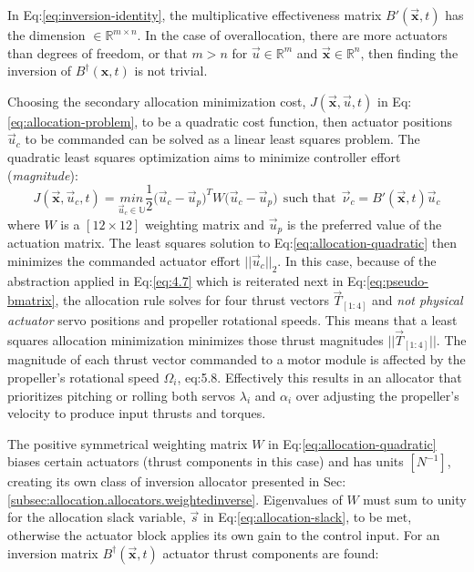 In Eq:\ref{eq:inversion-identity}, the multiplicative effectiveness matrix $B'(\vec{\mathbf{x}},t)$ has the dimension $\in\mathbb{R}^{m\times n}$. In the case of overallocation, there are more actuators than degrees of freedom, or that $m>n$ for $\vec{u}\in\mathbb{R}^{m}$ and $\vec{\mathbf{x}}\in\mathbb{R}^{n}$, then finding the inversion of $B^\dagger(\mathbf{x},t)$ is not trivial. 
\par
Choosing the secondary allocation minimization cost, $J(\vec{\mathbf{x}},\vec{u},t)$ in Eq:\ref{eq:allocation-problem}, to be a quadratic cost function, then actuator positions $\vec{u}_c$ to be commanded can be solved as a linear least squares problem. The quadratic least squares optimization aims to minimize controller effort (\emph{magnitude}):
\begin{equation}\label{eq:allocation-quadratic}
J(\vec{\mathbf{x}},\vec{u}_c,t)=\underset{\vec{u}_c\in\mathbb{U}}{min}\frac{1}{2}\big(\vec{u}_c-\vec{u}_p\big)^TW\big(\vec{u}_c-\vec{u}_p)~~\text{such that}~~\vec{\nu}_c=B'(\vec{\mathbf{x}},t)\vec{u}_c
\end{equation}
where $W$ is a $[12\times 12]$ weighting matrix and $\vec{u}_p$ is the preferred value of the actuation matrix. The least squares solution \cite{matrixcomputations} to Eq:\ref{eq:allocation-quadratic} then minimizes the commanded actuator effort $||\vec{u}_c||_2$. In this case, because of the abstraction applied in Eq:\ref{eq:4.7} which is reiterated next in Eq:\ref{eq:pseudo-bmatrix}, the allocation rule solves for four thrust vectors $\vec{T}_{[1:4]}$ and \emph{not physical actuator} servo positions and propeller rotational speeds. This means that a least squares allocation minimization minimizes those thrust magnitudes $||\vec{T}_{[1:4]}||$. The magnitude of each thrust vector commanded to a motor module is affected by the propeller's rotational speed $\Omega_i$, {eq:5.8}. Effectively this results in an allocator that prioritizes pitching or rolling both servos $\lambda_i$ and $\alpha_i$ over adjusting the propeller's velocity to produce input thrusts and torques. 
\par
The positive symmetrical weighting matrix $W$ in Eq:\ref{eq:allocation-quadratic} biases certain actuators (thrust components in this case) and has units $[N^{-1}]$, creating its own class of inversion allocator presented in Sec:\ref{subsec:allocation.allocators.weightedinverse}. Eigenvalues of $W$ must sum to unity for the allocation slack variable, $\vec{s}$ in Eq:\ref{eq:allocation-slack}, to be met, otherwise the actuator block applies its own gain to the control input. For an inversion matrix $B^\dagger(\vec{\mathbf{x}},t)$ actuator thrust components are found:
